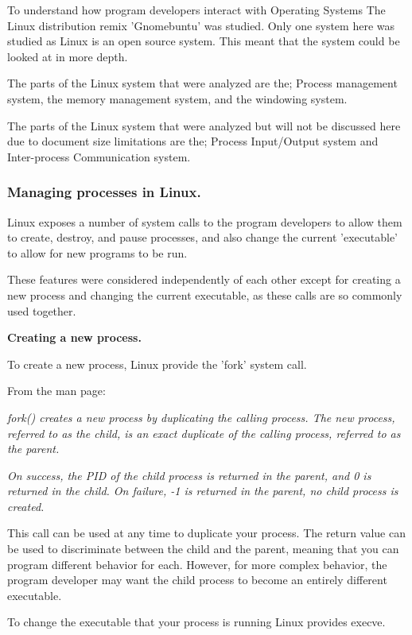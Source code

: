 \documentclass[a4paper]{report}
\begin{document}
To understand how program developers interact with Operating Systems The Linux distribution remix 'Gnomebuntu' was studied. Only one system here was studied as Linux is an open source system. This meant that the system could be looked at in more depth.

The parts of the Linux system that were analyzed are the; Process management system, the memory management system, and the windowing system.

The parts of the Linux system that were analyzed but will not be discussed here due to document size limitations are the; Process Input/Output system and Inter-process Communication system.

\subsubsection*{Managing processes in Linux.}

Linux exposes a number of system calls to the program developers to allow them to create, destroy, and pause processes, and also change the current 'executable' to allow for new programs to be run.

These features were considered independently of each other except for creating a new process and changing the current executable, as these calls are so commonly used together. 


\textbf{Creating a new process.}

To create a new process, Linux provide the 'fork' system call. 

From the man page: 

\textit {fork() creates a new process by duplicating the calling process.  The new process, referred to as the child, is an exact duplicate  of  the calling  process, referred to as the parent.} 

\textit {On  success,  the PID of the child process is returned in the parent, and 0 is returned in the child.  On failure, -1 is  returned  in  the parent, no child process is created.} \cite{manFork}

This call can be used at any time to duplicate your process. The return value can be used to discriminate between the child and the parent, meaning that you can program different behavior for each. However, for more complex behavior, the program developer may want the child process to become an entirely different executable.

To change the executable that your process is running Linux provides execve.
\end{document}
